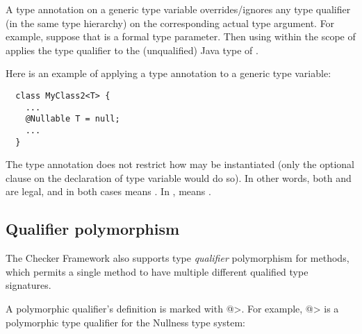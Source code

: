 A type annotation on a generic type variable overrides/ignores any type
qualifier (in the same type hierarchy) on the corresponding actual type
argument.  For example, suppose that  is a formal type parameter.
Then using  within the scope of  applies the type
qualifier  to the (unqualified) Java type of .

Here is an example of applying a type annotation to a generic type
variable:

\begin{Verbatim}
  class MyClass2<T> {
    ...
    @Nullable T = null;
    ...
  }
\end{Verbatim}

\noindent
The type annotation does not restrict how  may be instantiated
(only the optional  clause on the declaration of type
variable  would do so).  In other words, both
 and  are
legal, and in both cases  means .
In ,
 means .





\subsection{Qualifier polymorphism\label{qualifier-polymorphism}}

The Checker Framework also supports type \emph{qualifier} polymorphism for methods,
which permits a single method to have multiple different qualified type
signatures.

A polymorphic qualifier's definition is marked with
\<@>.  For example,
\<@> is a polymorphic type
qualifier for the Nullness type system:

